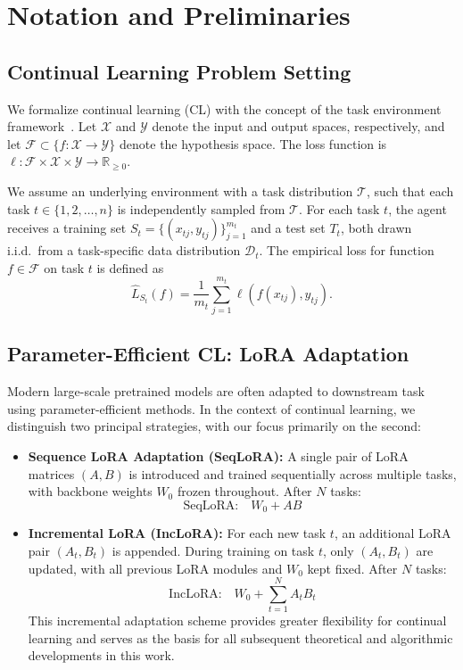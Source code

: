 \documentclass[letterpaper]{article} %
\begin{document}
\section{Notation and Preliminaries}

\subsection{Continual Learning Problem Setting }

We formalize continual learning (CL) with the concept of the task environment framework~\cite{pentinaPACBayesianBoundLifelong2014}. Let $\mathcal{X}$ and $\mathcal{Y}$ denote the input and output spaces, respectively, and let $\mathcal{F} \subset \{f : \mathcal{X} \rightarrow \mathcal{Y}\}$ denote the hypothesis space. The loss function is $\ell : \mathcal{F} \times \mathcal{X} \times \mathcal{Y} \rightarrow \mathbb{R}_{\geq 0}$.

We assume an underlying environment with a task distribution $\mathcal{T}$, such that each task $t \in \{1, 2, \ldots, n\}$ is independently sampled from $\mathcal{T}$. For each task $t$, the agent receives a training set $S_t = \{(x_{tj}, y_{tj})\}_{j=1}^{m_t}$ and a test set $T_t$, both drawn i.i.d.\ from a task-specific data distribution $\mathcal{D}_t$. The empirical loss for function $f \in \mathcal{F}$ on task $t$ is defined as
\begin{equation}
    \hat{L}_{S_t}(f) = \frac{1}{m_t} \sum_{j=1}^{m_t} \ell(f(x_{tj}), y_{tj}).
\end{equation}

\subsection{Parameter-Efficient CL: LoRA Adaptation}

Modern large-scale pretrained models are often adapted to downstream task using parameter-efficient methods. In the context of continual learning, we distinguish two principal strategies, with our focus primarily on the second:
\begin{itemize}
    \item \textbf{Sequence LoRA Adaptation (SeqLoRA):} A single  pair of LoRA matrices $(A, B)$ is introduced and trained sequentially across multiple tasks, with backbone weights $W_0$ frozen throughout. After $N$ tasks:
    $$
        \text{SeqLoRA:} \quad W_0 + AB
    $$
    \item \textbf{Incremental LoRA (IncLoRA):} For each new task $t$, an additional LoRA pair $(A_t, B_t)$ is appended. During training on task $t$, only $(A_t, B_t)$ are updated, with all previous LoRA modules and $W_0$ kept fixed.  After $N$ tasks:
    \begin{equation*}
        \text{IncLoRA:} \quad W_0 + \sum_{t=1}^N A_t B_t
    \end{equation*}
    This incremental adaptation scheme provides greater flexibility for continual learning and serves as the basis for all subsequent theoretical and algorithmic developments in this work.
\end{itemize}
\end{document}
